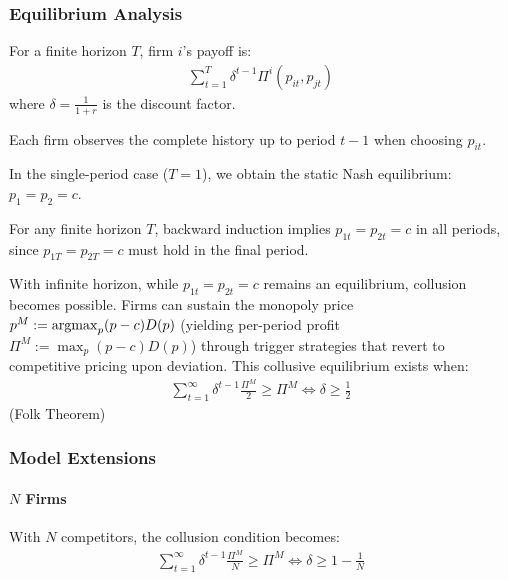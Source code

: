 \documentclass[11pt]{elegantbook_2}
\newcommand{\argmax}{\operatornamewithlimits{argmax}}
\begin{document}
\subsubsection{Equilibrium Analysis}
For a finite horizon $T$, firm $i$'s payoff is:
\begin{equation}
    \begin{aligned}
        \sum_{t=1}^T\delta^{t-1} \Pi^i(p_{it},p_{jt})
    \end{aligned}
    \nonumber
\end{equation}
where $\delta=\frac{1}{1+r}$ is the discount factor.

Each firm observes the complete history up to period $t-1$ when choosing $p_{it}$.

In the single-period case ($T=1$), we obtain the static Nash equilibrium: $p_1=p_2=c$.

For any finite horizon $T$, backward induction implies $p_{1t}=p_{2t}=c$ in all periods, since $p_{1T}=p_{2T}=c$ must hold in the final period.

With infinite horizon, while $p_{1t}=p_{2t}=c$ remains an equilibrium, collusion becomes possible. Firms can sustain the monopoly price $p^M:=\argmax_{p}(p-c)D(p)$ (yielding per-period profit $\Pi^M:=\max_{p}(p-c)D(p)$) through trigger strategies that revert to competitive pricing upon deviation. This collusive equilibrium exists when:
\begin{equation}
    \begin{aligned}
        \sum_{t=1}^\infty\delta^{t-1}\frac{\Pi^M}{2}\geq \Pi^M
        \Leftrightarrow \delta\geq \frac{1}{2}
    \end{aligned}
    \nonumber
\end{equation}
(Folk Theorem)

\subsubsection{Model Extensions}
\paragraph*{$N$ Firms}
With $N$ competitors, the collusion condition becomes:
\begin{equation}
    \begin{aligned}
        \sum_{t=1}^\infty\delta^{t-1}\frac{\Pi^M}{N}\geq \Pi^M
        \Leftrightarrow \delta\geq 1-\frac{1}{N}
    \end{aligned}
    \nonumber
\end{equation}
\end{document}
